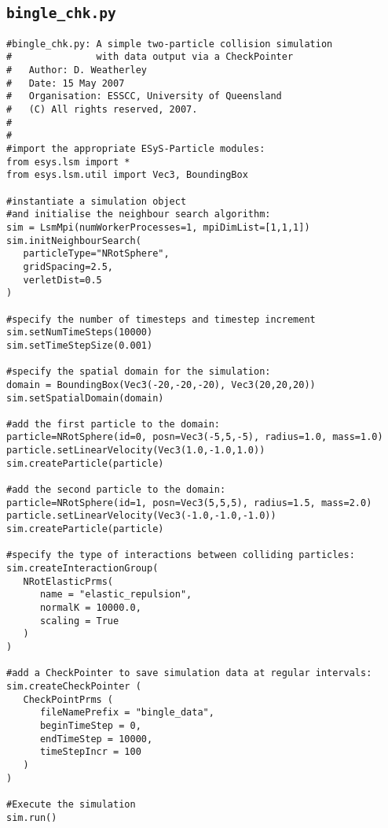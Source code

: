 \subsection{\texttt{bingle\_chk.py}}\label{code:bingle_chk}

\begin{verbatim}
#bingle_chk.py: A simple two-particle collision simulation 
#               with data output via a CheckPointer
#	Author: D. Weatherley
#	Date: 15 May 2007
#	Organisation: ESSCC, University of Queensland
#	(C) All rights reserved, 2007.
#
#
#import the appropriate ESyS-Particle modules:
from esys.lsm import *
from esys.lsm.util import Vec3, BoundingBox

#instantiate a simulation object 
#and initialise the neighbour search algorithm:
sim = LsmMpi(numWorkerProcesses=1, mpiDimList=[1,1,1])
sim.initNeighbourSearch(
   particleType="NRotSphere",
   gridSpacing=2.5,
   verletDist=0.5
)

#specify the number of timesteps and timestep increment 
sim.setNumTimeSteps(10000)
sim.setTimeStepSize(0.001)

#specify the spatial domain for the simulation:
domain = BoundingBox(Vec3(-20,-20,-20), Vec3(20,20,20))
sim.setSpatialDomain(domain)

#add the first particle to the domain:
particle=NRotSphere(id=0, posn=Vec3(-5,5,-5), radius=1.0, mass=1.0)
particle.setLinearVelocity(Vec3(1.0,-1.0,1.0))
sim.createParticle(particle)

#add the second particle to the domain:
particle=NRotSphere(id=1, posn=Vec3(5,5,5), radius=1.5, mass=2.0)
particle.setLinearVelocity(Vec3(-1.0,-1.0,-1.0))
sim.createParticle(particle)

#specify the type of interactions between colliding particles:
sim.createInteractionGroup(
   NRotElasticPrms(
      name = "elastic_repulsion",
      normalK = 10000.0,
      scaling = True
   )
)

#add a CheckPointer to save simulation data at regular intervals:
sim.createCheckPointer (
   CheckPointPrms (
      fileNamePrefix = "bingle_data",
      beginTimeStep = 0,
      endTimeStep = 10000,
      timeStepIncr = 100
   )
)

#Execute the simulation
sim.run()
\end{verbatim}

